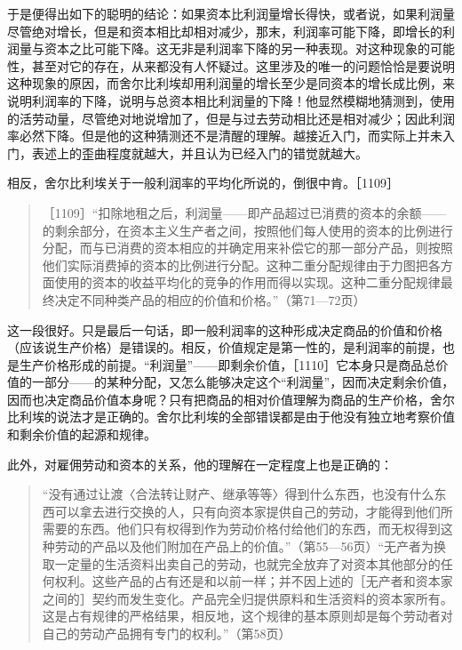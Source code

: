 于是便得出如下的聪明的结论：如果资本比利润量增长得快，或者说，如果利润量尽管绝对增长，但是和资本相比却相对减少，那末，利润率可能下降，即增长的利润量与资本之比可能下降。这无非是利润率下降的另一种表现。对这种现象的可能性，甚至对它的存在，从来都没有人怀疑过。这里涉及的唯一的问题恰恰是要说明这种现象的原因，而舍尔比利埃却用利润量的增长至少是同资本的增长成比例，来说明利润率的下降，说明与总资本相比利润量的下降！他显然模糊地猜测到，使用的活劳动量，尽管绝对地说增加了，但是与过去劳动相比还是相对减少；因此利润率必然下降。但是他的这种猜测还不是清醒的理解。越接近入门，而实际上并未入门，表述上的歪曲程度就越大，并且认为已经入门的错觉就越大。

相反，舍尔比利埃关于一般利润率的平均化所说的，倒很中肯。［1109］

\begin{quote}{［1109］“扣除地租之后，利润量——即产品超过已消费的资本的余额——的剩余部分，在资本主义生产者之间，按照他们每人使用的资本的比例进行分配，而与已消费的资本相应的并确定用来补偿它的那一部分产品，则按照他们实际消费掉的资本的比例进行分配。这种二重分配规律由于力图把各方面使用的资本的收益平均化的竞争的作用而得以实现。这种二重分配规律最终决定不同种类产品的相应的价值和价格。”（第71—72页）}\end{quote}

这一段很好。只是最后一句话，即一般利润率的这种形成决定商品的价值和价格（应该说生产价格）是错误的。相反，价值规定是第一性的，是利润率的前提，也是生产价格形成的前提。“利润量”——即剩余价值，［1110］它本身只是商品总价值的一部分——的某种分配，又怎么能够决定这个“利润量”，因而决定剩余价值，因而也决定商品价值本身呢？只有把商品的相对价值理解为商品的生产价格，舍尔比利埃的说法才是正确的。舍尔比利埃的全部错误都是由于他没有独立地考察价值和剩余价值的起源和规律。

此外，对雇佣劳动和资本的关系，他的理解在一定程度上也是正确的：

\begin{quote}{“没有通过让渡〈合法转让财产、继承等等〉得到什么东西，也没有什么东西可以拿去进行交换的人，只有向资本家提供自己的劳动，才能得到他们所需要的东西。他们只有权得到作为劳动价格付给他们的东西，而无权得到这种劳动的产品以及他们附加在产品上的价值。”（第55—56页）“无产者为换取一定量的生活资料出卖自己的劳动，也就完全放弃了对资本其他部分的任何权利。这些产品的占有还是和以前一样；并不因上述的［无产者和资本家之间的］契约而发生变化。产品完全归提供原料和生活资料的资本家所有。这是占有规律的严格结果，相反地，这个规律的基本原则却是每个劳动者对自己的劳动产品拥有专门的权利。”（第58页）}\end{quote}

